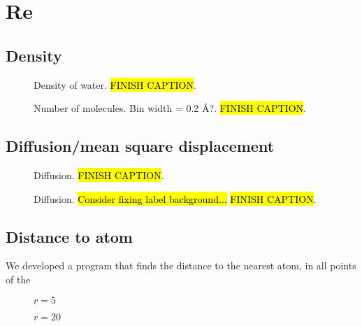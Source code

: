 \chapter{Re}
\section{Density}
\begin{figure}[htpb]%
    \centering%
    \caption{%
        Density of water. \hl{FINISH CAPTION}. %
    }%
\end{figure}%
\begin{figure}[htpb]%
    \centering%
    \caption{%
        Number of molecules. Bin width = 0.2 \AA?. \hl{FINISH CAPTION}. %
    }%
\end{figure}%

\FloatBarrier
\section{Diffusion/mean square displacement}
\begin{figure}[htpb]%
    \centering%
    {
        \newcommand{\f}{\footnotesize}
    }
    \caption{%
        Diffusion. \hl{FINISH CAPTION}. %
    }%
\end{figure}%

\begin{figure}[htpb]%
    \centering%
    {
        \newcommand{\f}{\footnotesize}%
    }
    \caption{%
        Diffusion. \hl{Consider fixing label background...} \hl{FINISH CAPTION}. %
    }%
\end{figure}%

\FloatBarrier
\section{Distance to atom}
We developed a program that finds the distance to the nearest atom, in all points of the 
%
\setlength{\myfigwidth}{0.90\textwidth}%
\begin{figure}[htpb]%
    \centering%
    \caption{$r = 5$ \Ang}%
    \label{fig:distance_to_atom_r05}%
\end{figure}%
%
\begin{figure}[htpb]%
    \centering%
    \caption{$r = 20$ \Ang}%
    \label{fig:distance_to_atom_r20}%
\end{figure}%

